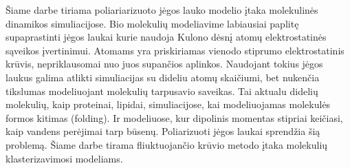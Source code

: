Šiame darbe tiriama poliariarizuoto jėgos lauko modelio įtaka molekulinės dinamikos simuliacijose.
Bio molekulių modeliavime labiausiai paplitę supaprastinti jėgos laukai kurie naudoja Kulono dėsnį atomų elektrostatinės sąveikos įvertinimui.
Atomams yra priskiriamas vienodo stiprumo elektrostatinis krūvis, nepriklausomai nuo juos supančios aplinkos.
Naudojant tokius jėgos laukus galima atlikti simuliacijas su dideliu atomų skaičiumi, bet nukenčia tikslumas modeliuojant molekulių tarpusavio saveikas.
Tai aktualu didelių molekulių, kaip proteinai, lipidai, simuliacijose, kai modeliuojamas molekulės formos kitimas (folding).
Ir modeliuose, kur dipolinis momentas stipriai keičiasi, kaip vandens perėjimai tarp būsenų.
Poliarizuoti jėgos laukai sprendžia šią problemą.
Šiame darbe tirama fliuktuojančio krūvio metodo įtaka molekulių klasterizavimosi modeliams.

